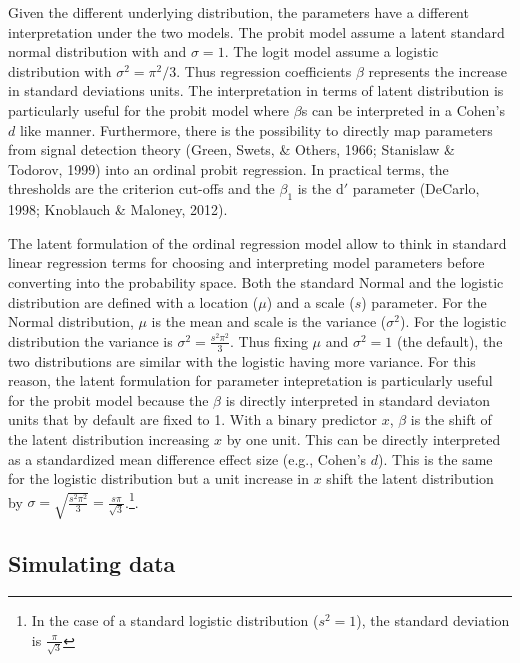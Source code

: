 \documentclass[
  man,floatsintext]{apa6}
\begin{document}
\normalsize

Given the different underlying distribution, the parameters have a different interpretation under the two models. The probit model assume a latent standard normal distribution with and \(\sigma = 1\). The logit model assume a logistic distribution with \(\sigma^2 = \pi^2/3\). Thus regression coefficients \(\beta\) represents the increase in standard deviations units. The interpretation in terms of latent distribution is particularly useful for the probit model where \(\beta\)s can be interpreted in a Cohen's \(d\) like manner. Furthermore, there is the possibility to directly map parameters from signal detection theory (Green, Swets, \& Others, 1966; Stanislaw \& Todorov, 1999) into an ordinal probit regression. In practical terms, the thresholds are the criterion cut-offs and the \(\beta_1\) is the d\('\) parameter (DeCarlo, 1998; Knoblauch \& Maloney, 2012).

The latent formulation of the ordinal regression model allow to think in standard linear regression terms for choosing and interpreting model parameters before converting into the probability space. Both the standard Normal and the logistic distribution are defined with a location (\(\mu\)) and a scale (\(s\)) parameter. For the Normal distribution, \(\mu\) is the mean and scale is the variance (\(\sigma^2\)). For the logistic distribution the variance is \(\sigma^2=\frac{s^2\pi^2}{3}\). Thus fixing \(\mu\) and \(\sigma^2 = 1\) (the default), the two distributions are similar with the logistic having more variance. For this reason, the latent formulation for parameter intepretation is particularly useful for the probit model because the \(\beta\) is directly interpreted in standard deviaton units that by default are fixed to 1. With a binary predictor \(x\), \(\beta\) is the shift of the latent distribution increasing \(x\) by one unit. This can be directly interpreted as a standardized mean difference effect size (e.g., Cohen's \(d\)). This is the same for the logistic distribution but a unit increase in \(x\) shift the latent distribution by \(\sigma = \sqrt{\frac{s^2 \pi^2}{3}} = \frac{s\pi}{\sqrt{3}}\).\footnote{In the case of a standard logistic distribution (\(s^2 = 1\)), the standard deviation is \(\frac{\pi}{\sqrt{3}}\)}.

\subsection{Simulating data}\label{simulating-data}
\end{document}
